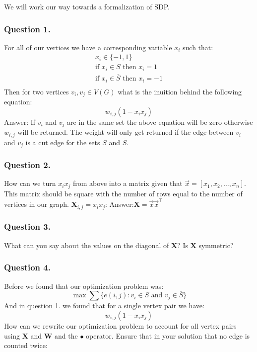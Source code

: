 \documentclass{article}
\begin{document}
We will work our way towards a formalization of SDP.
\subsubsection{Question 1.}
For all of our vertices we have a corresponding variable \( x_i \) such that:
\begin{gather*}
x_i \in \{ -1, 1 \} \\
\text{if } x_i \in S \text{ then } x_i = 1 \\
\text{if } x_i \in \overline{S} \text{ then } x_i = -1 \\
\end{gather*}
Then for two vertices \( v_i, v_j \in V(G) \) what is the inuition behind the following equation:
\[
w_{i, j}(1 - x_i x_j)
\]
Answer: If \( v_i \) and \( v_j \) are in the same set the above equation will be zero otherwise \( w_{i, j} \) will be returned. The weight will only get returned if the edge between \( v_i \) and \( v_j \) is a cut edge for the sets \( S \) and \( \overline{S} \).

\subsubsection{Question 2.}
How can we turn \( x_i x_j \) from above into a matrix given that \( \vec{x} = [x_1, x_2, \ldots, x_n] \). This matrix should be square with the number of rows equal to the number of vertices in our graph. \( \mathbf{X}_{i, j} = x_i x_j \):
Answer:\( \mathbf{X} = \vec{x} \vec{x}^\top \)

\subsubsection{Question 3.}
What can you say about the values on the diagonal of \( \mathbf{X} \)? Is \( \mathbf{X} \) symmetric?

\subsubsection{Question 4.}
Before we found that our optimization problem was:
\[
  \max \sum \{ e(i, j): v_i \in S \text{ and } v_j \in \overline{S} \}
\]
And in question 1. we found that for a single vertex pair we have:
\[
w_{i, j}(1 - x_i x_j)
\]
How can we rewrite our optimization problem to account for all vertex pairs using \( \mathbf{X} \) and \( \mathbf{W} \) and the \( \bullet \) operator.
Ensure that in your solution that no edge is counted twice:
\end{document}
